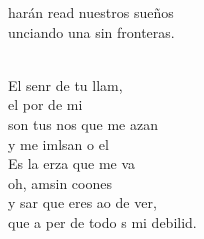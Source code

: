 \begin{cancion}
	harán read nuestros sueños\\
	unciando una sin fronteras.\\\jump\\
	\begin{chorus}%
	El senr de tu llam,\\
	el por de mi\\
	son tus nos que me azan\\
	y me imlsan o el \\
	Es la erza que me va\\
	oh,  amsin coones\\
	y sar que eres ao de ver,\\
	que a per de todo s mi debilid.\\
	\end{chorus}%
	\jump\\
\end{cancion}%
